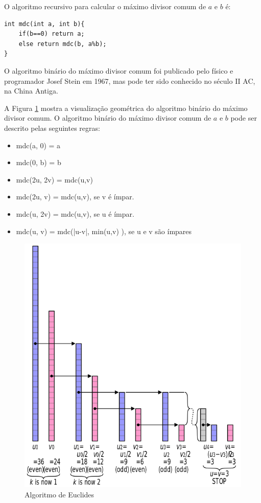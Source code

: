 O algoritmo recursivo para calcular o máximo divisor comum de $a$ e $b$ é: 

\begin{verbatim}
int mdc(int a, int b){
	if(b==0) return a;
	else return mdc(b, a%b);
}
\end{verbatim}

\begin{exemplo}
O algoritmo binário do máximo divisor comum foi publicado pelo físico e programador Josef Stein em 1967, mas pode ter sido conhecido no século II AC, na China Antiga.

A Figura \ref{fig::binarygcd} mostra a visualização geométrica do algoritmo binário do máximo divisor comum. O algoritmo binário do máximo divisor comum de $a$ e $b$ pode ser descrito pelas seguintes regras:

\begin{itemize}
    \item mdc(a, 0) = a
    \item mdc(0, b) = b
    \item mdc(2u, 2v) = mdc(u,v)
    \item mdc(2u, v) = mdc(u,v), se v é ímpar.
    \item mdc(u, 2v) = mdc(u,v), se u é ímpar.
    \item mdc(u, v) = mdc(|u-v|, min(u,v) ), se u e v são ímpares
    
\end{itemize}


\end{exemplo}


\begin{figure}[!h]
\label{fig::binarygcd}
\centering
\includegraphics[scale=0.5]{images/Binary_GCD_algorithm_visualisation.svg.png}
\caption{Algoritmo de Euclides}
\end{figure}


